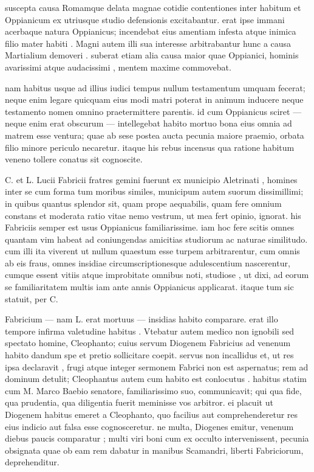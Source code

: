  suscepta causa Romamque delata magnae cotidie contentiones inter habitum et Oppianicum ex utriusque studio defensionis excitabantur. erat ipse immani acerbaque natura Oppianicus; incendebat eius amentiam infesta atque inimica filio mater habiti . Magni autem illi sua interesse arbitrabantur hunc a causa Martialium demoveri . suberat etiam alia causa maior quae Oppianici, hominis avarissimi atque audacissimi , mentem maxime commovebat.

 nam habitus usque ad illius iudici tempus nullum testamentum umquam fecerat; neque enim legare quicquam eius modi matri poterat in animum inducere neque testamento nomen omnino praetermittere parentis. id cum Oppianicus sciret — neque enim erat obscurum — intellegebat habito mortuo bona eius omnia ad matrem esse ventura; quae ab sese postea aucta pecunia maiore praemio, orbata filio minore periculo necaretur. itaque his rebus incensus qua ratione habitum veneno tollere conatus sit cognoscite.

 C. et L. Lucii Fabricii fratres gemini fuerunt ex municipio Aletrinati , homines inter se cum forma tum moribus similes, municipum autem suorum dissimillimi; in quibus quantus splendor sit, quam prope aequabilis, quam fere omnium constans et moderata ratio vitae nemo vestrum, ut mea fert opinio, ignorat. his Fabriciis semper est usus Oppianicus familiarissime. iam hoc fere scitis omnes quantam vim habeat ad coniungendas amicitias studiorum ac naturae similitudo. cum illi ita viverent ut nullum quaestum esse turpem arbitrarentur, cum omnis ab eis fraus, omnes insidiae circumscriptionesque adulescentium nascerentur, cumque essent vitiis atque improbitate omnibus noti, studiose , ut dixi, ad eorum se familiaritatem multis iam ante annis Oppianicus applicarat. itaque tum sic statuit, per C.

 Fabricium — nam L. erat mortuus — insidias habito comparare. erat illo tempore infirma valetudine habitus . Vtebatur autem medico non ignobili sed spectato homine, Cleophanto; cuius servum Diogenem Fabricius ad venenum habito dandum spe et pretio sollicitare coepit. servus non incallidus et, ut res ipsa declaravit , frugi atque integer sermonem Fabrici non est aspernatus; rem ad dominum detulit; Cleophantus autem cum habito est conlocutus . habitus statim cum M. Marco Baebio senatore, familiarissimo suo, communicavit; qui qua fide, qua prudentia, qua diligentia fuerit meminisse vos arbitror. ei placuit ut Diogenem habitus emeret a Cleophanto, quo facilius aut comprehenderetur res eius indicio aut falsa esse cognosceretur. ne multa, Diogenes emitur, venenum diebus paucis comparatur ; multi viri boni cum ex occulto intervenissent, pecunia obsignata quae ob eam rem dabatur in manibus Scamandri, liberti Fabriciorum, deprehenditur.

